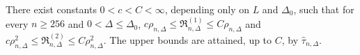 There exist constants \(0<c<C<\infty\), depending only on \(L\) and \(\Delta_0\), such that for every \(n\geq256\) and \(0<\Delta\leq\Delta_0\), \(c\rho_{n,\Delta}\leq\mathfrak R^{(1)}_{n,\Delta}\leq C\rho_{n,\Delta}\) and \(c\rho_{n,\Delta}^2\leq\mathfrak R^{(2)}_{n,\Delta}\leq C\rho_{n,\Delta}^2\). The upper bounds are attained, up to \(C\), by \(\widehat\tau_{n,\Delta}\).